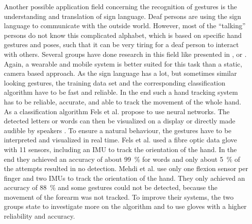 Another possible application field concerning the recognition of gestures is the understanding and translation of sign language. Deaf persons are using the sign language to communicate with the outside world. However, most of the ``talking'' persons do not know this complicated alphabet, which is based on specific hand gestures and poses, such that it can be very tiring for a deaf person to interact with others. Several groups have done research in this field like presented in \cite{mehdi2002sign}, \cite{fels1993glove} or \cite{dipietro2008survey}. Again, a wearable and mobile system is better suited for this task than a static, camera based approach. As the sign language has a lot, but sometimes similar looking gestures, the training data set and the corresponding classification algorithm have to be fast and reliable. In the end such a hand tracking system has to be reliable, accurate, and able to track the movement of the whole hand. As a classification algorithm Fels et al. propose to use neural networks. The detected letters or words can then be visualized on a display or directly made audible by speakers \cite{fels1993glove}. To ensure a natural behaviour, the gestures have to be interpreted and visualized in real time. Fels et al. used a fibre optic data glove with 11 sensors, including an IMU to track the orientation of the hand. In the end they achieved an accuracy of about \SI{99}{\percent} for words and only about \SI{5}{\percent} of the attempts resulted in no detection. Mehdi et al. use only one flexion sensor per finger and two IMUs to track the orientation of the hand. They only achieved an accuracy of \SI{88}{\percent} and some gestures could not be detected, because the movement of the forearm was not tracked. To improve their systems, the two groups state to investigate more on the algorithm and to use gloves with a higher reliability and accuracy.
